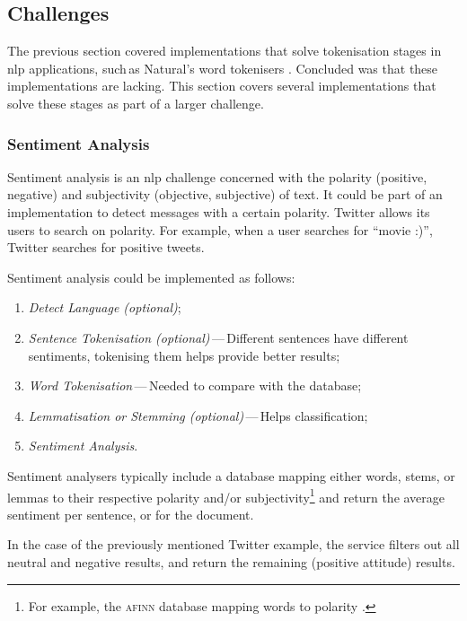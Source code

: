 \subsection{Challenges}\label{challenges}

The previous section covered implementations that solve tokenisation stages
  in \gls{nlp} applications, such\,as Natural's word
  tokenisers \autocite{NaturalNode/natural-source-code}.
Concluded was that these implementations are lacking.
This section covers several implementations that solve these stages
  as part of a larger challenge.

\subsubsection{Sentiment Analysis}\label{sentiment-analysis}

Sentiment analysis is an \gls{nlp} challenge concerned with the polarity
  (positive, negative) and subjectivity (objective, subjective) of text.
It could be part of an implementation to detect messages with a certain
  polarity.
Twitter allows its users to search on polarity.
For example, when a user searches for ``movie :)'', Twitter searches for
  positive tweets.

Sentiment analysis could be implemented as follows:

\begin{enumerate}
\item\emph{Detect Language (optional)};
\item\emph{Sentence Tokenisation (optional)}\,---\,Different sentences have
    different sentiments, tokenising them helps provide better results;
\item\emph{Word Tokenisation}\,---\,Needed to compare with the database;
\item\emph{Lemmatisation or Stemming (optional)}\,---\,Helps classification;
\item\emph{Sentiment Analysis}.
\end{enumerate}

\noindent Sentiment analysers typically include a
  database mapping either words, stems, or lemmas to their respective
  polarity and\slash or subjectivity\footnote{For example, the \textsc{afinn}
    database mapping words to polarity \autocite{nielsen-finn-arup-afinn}.}
  and return the average sentiment per sentence, or for the document.

In the case of the previously mentioned Twitter example, the service filters
  out all neutral and negative results, and return the remaining (positive
  attitude) results.

